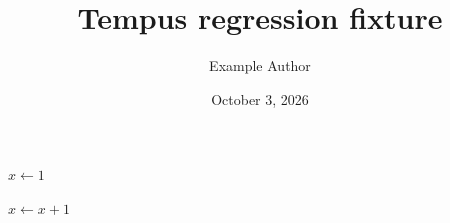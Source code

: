 \documentclass[algorithms,listings]{tempusreport}
\title{Tempus regression fixture}
\author{Example Author}\date{October 3, 2026}
\begin{document}
\maketitle

\clearpage
{}
\begin{algorithm}[htbp]
\caption{One algorithm.}\label{alg:original}
\begin{algorithmic}[1]\State $x\gets1$\end{algorithmic}
\end{algorithm}
\clearpage
\begin{algorithm}[htbp]
\begin{algorithmic}[1]\State $x\gets x+1$\end{algorithmic}
\end{algorithm}
\end{document}
